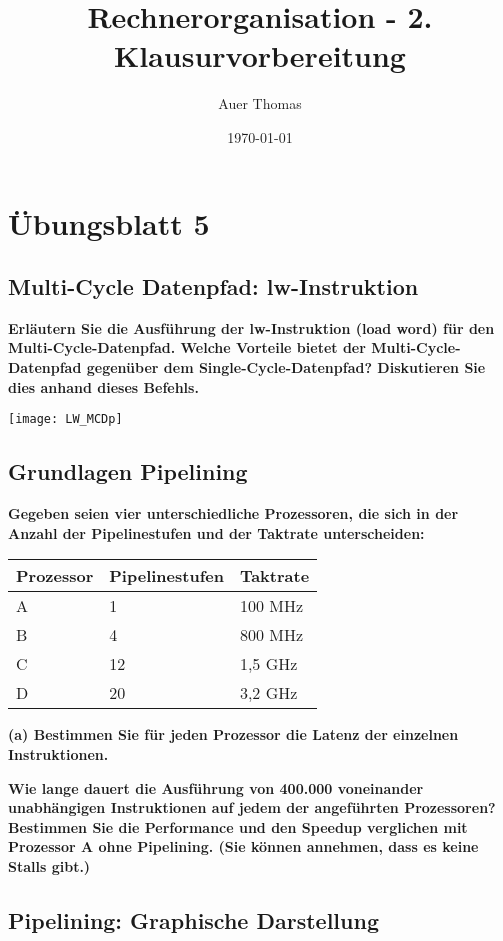 \documentclass[11pt]{article}
\title{Rechnerorganisation - 2. Klausurvorbereitung}
\author{Auer Thomas}
\date{\today}
\begin{document}
\maketitle
\tableofcontents
\graphicspath{{graphics/}}
\pagebreak
\section{Übungsblatt 5}
    \subsection{Multi-Cycle Datenpfad: lw-Instruktion}
    \textbf{Erläutern Sie die Ausführung der lw-Instruktion (load word) für den Multi-Cycle-Datenpfad.
    Welche Vorteile bietet der Multi-Cycle-Datenpfad gegenüber dem Single-Cycle-Datenpfad?
    Diskutieren Sie dies anhand dieses Befehls.}

    \texttt{[image: LW\_MCDp]}

    \subsection{Grundlagen Pipelining}
    \textbf{Gegeben seien vier unterschiedliche Prozessoren, die sich in der Anzahl der Pipelinestufen und
    der Taktrate unterscheiden:\\}
    \begin{center}
        \begin{tabular}{l|l|l}
        Prozessor & Pipelinestufen & Taktrate \\\hline
        A & 1 & 100 MHz \\
        B & 4 & 800 MHz \\
        C & 12 & 1,5 GHz \\
        D & 20 & 3,2 GHz \\
        \end{tabular}
    \end{center}
    \textbf{(a) Bestimmen Sie für jeden Prozessor die Latenz der einzelnen Instruktionen.}
    
    \textbf{Wie lange dauert die Ausführung von 400.000 voneinander unabhängigen Instruktionen
    auf jedem der angeführten Prozessoren? Bestimmen Sie die Performance und den
    Speedup verglichen mit Prozessor A ohne Pipelining. (Sie können annehmen, dass es
    keine Stalls gibt.)}

    \subsection{Pipelining: Graphische Darstellung}
\end{document}
